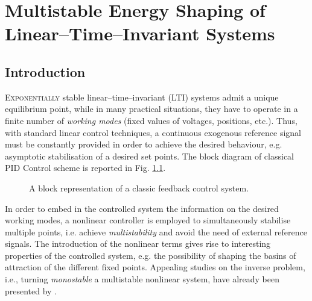 %
\chapter{Multistable Energy Shaping of Linear--Time--Invariant Systems}

\label{chap:multistable}
\minitoc

\thispagestyle{empty}

\newpage
\section{Introduction}
\lettrine[lines=4]{\color{brickred}E}{xponentially} stable linear--time--invariant (LTI) systems admit a unique equilibrium point, while in many practical situations, they have to operate in a finite number of \textit{working modes} (fixed values of voltages, positions, etc.).
Thus, with standard linear control techniques, a continuous exogenous reference signal must be constantly provided in order to achieve the desired behaviour, e.g. asymptotic stabilisation of a desired set points. The block diagram of classical PID Control scheme is reported in Fig. \ref{fig:PID}.
%
\begin{figure}[!h]
	\centering
	
	\caption{A block representation of a classic feedback control system.}
	\label{fig:PID}
\end{figure}
%
In order to embed in the controlled system the information on the desired working modes, a nonlinear controller is employed to simultaneously stabilise multiple points, i.e. achieve \textit{multistability} and avoid the need of external reference signals.
The introduction of the nonlinear terms gives rise to interesting properties of the controlled system, e.g. the possibility of shaping the basins of attraction of the different fixed points.
Appealing studies on the inverse problem, i.e., turning \textit{monostable} a {multistable} nonlinear system, have already been presented by \cite{PISARCHIK2014167}.
\newline

